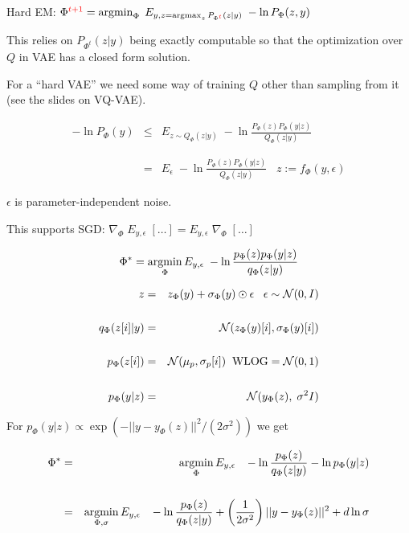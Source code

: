 {\vfill
Hard EM: $\Phi^{\color{red} t+1} =  \operatorname*{argmin}_\Phi\; E_{y, z = \operatorname*{argmax}_z P_{\Phi^{\color{red} t}}(z|y)} \;- \ln P_\Phi(z,y)$

\vfill
This relies on $P_{\Phi^t}(z|y)$ being exactly computable so that the optimization over $Q$ in VAE has a closed form solution.

\vfill
For a ``hard VAE'' we need some way of training $Q$ other than sampling from it (see the slides on VQ-VAE).


\begin{eqnarray*}
- \ln P_\Phi(y) & \leq & E_{z \sim Q_\Phi(z|y)}\;-\ln \frac{P_\Phi(z)P_\Phi(y|z)}{Q_\Phi(z|y)} \\
\\
\\
& = & E_\epsilon\;-\ln \frac{P_\Phi(z)P_\Phi(y|z)}{Q_\Phi(z|y)}\;\;\;z := f_\Phi(y,\epsilon)
\end{eqnarray*}

\vfill
$\epsilon$ is parameter-independent noise.

\vfill
This supports SGD: $\nabla_\Phi \;E_{y,\epsilon}\; [\ldots] = E_{y,\epsilon}\; \nabla_\Phi\;[\ldots]$

$$\Phi^* = \operatorname*{argmin}_\Phi E_{y,\epsilon}\;-\ln \frac{p_\Phi(z)p_\Phi(y|z)}{q_\Phi(z|y)}$$

{\color{red}
\begin{eqnarray*}
z & = & z_\Phi(y) + \sigma_\Phi(y) \odot \epsilon\;\;\;\epsilon \sim {\cal N}(0,I) \\
\\
q_\Phi(z[i]|y) & = & {\cal N}(z_\Phi(y)[i],\sigma_\Phi(y)[i]) \\
\\
p_\Phi(z[i]) & = & {\cal N}(\mu_p,\sigma_p[i]) \;\;\mbox{WLOG} = {\cal N}(0,1) \\
\\
p_\Phi(y|z) & = & {\cal N}(y_\Phi(z),\;\sigma^2I)
\end{eqnarray*}
}


For $p_\Phi(y|z) \propto \exp(-||y - y_\Phi(z)||^2/(2\sigma^2))$ we get

\begin{eqnarray*}
\Phi^* & = & \operatorname*{argmin}_{\Phi} E_{y,\epsilon}\;\;\;-\ln \frac{p_\Phi(z)}{q_\Phi(z|y)} - \ln p_\Phi(y|z) \\
\\
       & = & \operatorname*{argmin}_{\Phi,\sigma} E_{y,\epsilon}\;\;\;-\ln \frac{p_\Phi(z)}{q_\Phi(z|y)} +\left(\frac{1}{2\sigma^2}\right)||y - y_\Phi(z)||^2 + d\ln \sigma
\end{eqnarray*}

}
